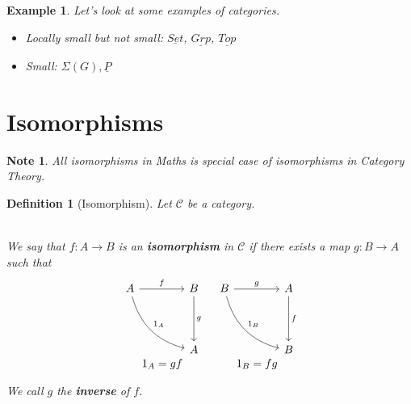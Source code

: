 \documentclass{article}
\newtheorem{definition}{Definition}[section]
\newtheorem{example}{Example}[section]
\newtheorem{note}{Note}[section]
\begin{document}
    \vspace{0.2in}

    \begin{example}
        Let's look at some examples of categories.

        \begin{itemize}
            \item Locally small but not small: $\underline{Set}$, $\underline{Grp}$, $\underline{Top}$
            \item Small: $\Sigma(G), \underline{P}$
        \end{itemize}
    \end{example}


    \section{Isomorphisms}

    \begin{note}
        All isomorphisms in Maths is special case of isomorphisms in Category Theory.
    \end{note}

    \begin{definition}[Isomorphism]
        Let $\mathcal{C}$ be a category.

        \\

        We say that $f: A \to B$ is an \textbf{isomorphism} in $\mathcal{C}$ if there exists a map
        $g: B \to A$ such that
        \[
            \begin{array}{c c} %
                \begin{tikzcd}[column sep=4em, row sep=4em]
                    A  \arrow[r, "f"] \arrow[dr, bend right, "1_A"]
                    & B  \arrow[d, "g"]\\
                    & A
                \end{tikzcd}
                &
                \begin{tikzcd}[column sep=4em, row sep=4em]
                    B  \arrow[r, "g"] \arrow[dr, bend right, "1_B"]
                    & A  \arrow[d, "f"]\\
                    & B
                \end{tikzcd} \\
                \text{$1_A = gf$} & \text{$1_B = fg$}
            \end{array}
        \]

        We call $g$ the \textbf{inverse} of $f$.
    \end{definition}
\end{document}
